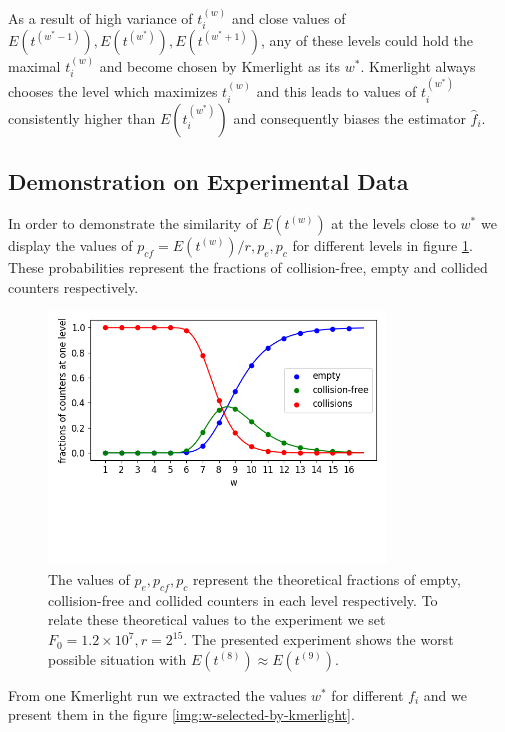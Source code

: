 As a result of high variance of $t_i^{(w)}$ and close values of $E(t^{(w^*-1)}), 
E(t^{(w^*)}),E(t^{(w^*+1)})$, any of these levels could hold the maximal $t_i^{(w)}$ 
and become chosen by Kmerlight as its $w^*$. Kmerlight always chooses the level which 
maximizes $t_i^{(w)}$ and this leads to values of $t_i^{(w^*)}$ consistently higher
than $E(t_i^{(w^*)})$ and consequently biases the estimator $\hat f_i$.

\subsection{Demonstration on Experimental Data}

In order to demonstrate the similarity of $E(t^{(w)})$ at the levels close to $w^*$ we
display the values of $p_{cf} = E(t^{(w)}) / r, p_e, p_c$ for different levels in
figure \ref{img:pe-pcf-pc}. These probabilities represent the fractions of 
collision-free, empty and collided counters respectively. 

\begin{figure}[h]
\centerline{\includegraphics[width=0.8\textwidth, trim={0cm, 3.5cm, 0cm, 0cm}, clip]{images/pcf.png}}
\caption[Plot of $p_e, p_{cf}, p_c$ across the levels]{The values of $p_e, p_{cf}, p_c$ 
represent the theoretical fractions of empty, collision-free and collided counters in
each level respectively. To relate these theoretical values to the experiment we set 
$F_0 = 1.2 \times 10^7, r = 2^{15}$. The presented experiment shows the worst possible
situation with $E(t^{(8)}) \approx E(t^{(9)})$.}
\label{img:pe-pcf-pc}
\end{figure}

From one Kmerlight run we extracted the values $w^*$ for different $f_i$ and we present them in the figure \ref{img:w-selected-by-kmerlight}.

